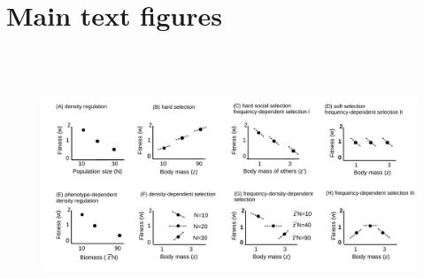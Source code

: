 \documentclass{article}
\begin{document}
\newpage
\section{Main text figures}

\begin{figure} [H]
	\centering
	\includegraphics[width=15cm, height=8cm]{Figures/Fig2.pdf}

\end{figure}
\end{document}
